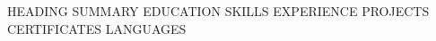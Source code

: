 \documentclass[letterpaper,11pt]{article}
\begin{document}
\selectfont

{{HEADING}}
{{SUMMARY}}
{{EDUCATION}}
{{SKILLS}}
{{EXPERIENCE}}
{{PROJECTS}}
{{CERTIFICATES}}
{{LANGUAGES}}
\end{document}
